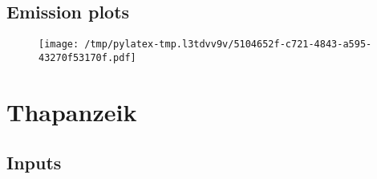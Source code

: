 \documentclass{article}%
\begin{document}
\subsection{Emission plots}%
\label{subsec:Emissionplots}%


\begin{figure}[htbp]%
\centering%
\texttt{[image: /tmp/pylatex-tmp.l3tdvv9v/5104652f-c721-4843-a595-43270f53170f.pdf]}%
\end{figure}

%
\section{Thapanzeik}%
\label{sec:Thapanzeik}%
\subsection{Inputs}%
\label{subsec:Inputs}%
\end{document}

